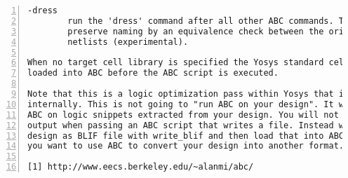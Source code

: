 \begin{lstlisting}[numbers=left,frame=single]
    -dress
        run the 'dress' command after all other ABC commands. This aims to
        preserve naming by an equivalence check between the original and post-ABC
        netlists (experimental).

When no target cell library is specified the Yosys standard cell library is
loaded into ABC before the ABC script is executed.

Note that this is a logic optimization pass within Yosys that is calling ABC
internally. This is not going to "run ABC on your design". It will instead run
ABC on logic snippets extracted from your design. You will not get any useful
output when passing an ABC script that writes a file. Instead write your full
design as BLIF file with write_blif and then load that into ABC externally if
you want to use ABC to convert your design into another format.

[1] http://www.eecs.berkeley.edu/~alanmi/abc/
\end{lstlisting}

